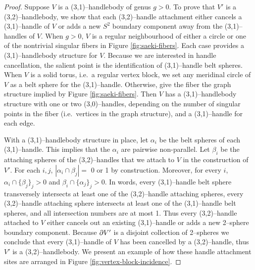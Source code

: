 \begin{proof}
	Suppose $V$ is a (3,1)--handlebody of genus $g>0$.
	To prove that $V'$ is a (3,2)--handlebody, we show that each (3,2)--handle attachment either cancels a (3,1)--handle of $V$ or adds a new $S^2$ boundary component away from the (3,1)--handles of $V$.
	When $g>0$, $V$ is a regular neighbourhood of either a circle or one of the nontrivial singular fibers in Figure \ref{fig:saeki-fibers}.
	Each case provides a (3,1)--handlebody structure for $V$.
	Because we are interested in handle cancellation, the salient point is the identification of (3,1)--handle belt spheres.
	When $V$ is a solid torus, i.e.\ a regular vertex block, we set any meridinal circle of $V$ as a belt sphere for the (3,1)--handle.
	Otherwise, give the fiber the graph structure implied by Figure \ref{fig:saeki-fibers}.
	Then $V$ has a (3,1)--handlebody structure with one or two (3,0)--handles, depending on the number of singular points in the fiber (i.e.\ vertices in the graph structure), and a (3,1)--handle for each edge.
	
	With a (3,1)--handlebody structure in place, let $\alpha_i$ be the belt spheres of each (3,1)--handle.
	This implies that the $\alpha_i$ are pairwise non-parallel.
	Let $\beta_i$ be the attaching spheres of the (3,2)--handles that we attach to $V$ in the construction of $V'$.
	For each $i,j$, $|\alpha_i\cap\beta_j|=$ 0 or 1 by construction.
	Moreover, for every $i$, $\alpha_i\cap\{\beta_j\}_j>0$ and $\beta_i\cap\{\alpha_j\}_j>0$.
	In words, every (3,1)--handle belt sphere transversely intersects at least one of the (3,2)--handle attaching spheres, every (3,2)--handle attaching sphere intersects at least one of the (3,1)--handle belt spheres, and all intersection numbers are at most 1.
	Thus every (3,2)--handle attached to $V$ either cancels out an existing (3,1)--handle or adds a new 2--sphere boundary component.
	Because $\partial V'$ is a disjoint collection of 2--spheres we conclude that every (3,1)--handle of $V$ has been cancelled by a (3,2)--handle, thus $V'$ is a (3,2)--handlebody.
	We present an example of how these handle attachment sites are arranged in Figure \ref{fig:vertex-block-incidence}.
	

\end{proof}
